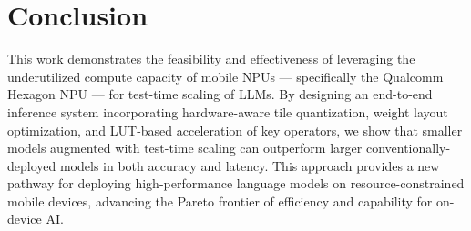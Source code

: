 \section{Conclusion}

This work demonstrates the feasibility and effectiveness of leveraging the underutilized compute capacity of mobile NPUs — specifically the Qualcomm Hexagon NPU — for test-time scaling of LLMs. By designing an end-to-end inference system incorporating hardware-aware tile quantization, weight layout optimization, and LUT-based acceleration of key operators, we show that smaller models augmented with test-time scaling can outperform larger conventionally-deployed models in both accuracy and latency. This approach provides a new pathway for deploying high-performance language models on resource-constrained mobile devices, advancing the Pareto frontier of efficiency and capability for on-device AI.


